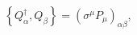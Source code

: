 \begin{equation}
\left \{Q_{\alpha}^{\dagger},Q_{\beta}\right \}= \left( \sigma^{\mu} P_{\mu}\right )_
{\alpha\beta},
\end{equation}

